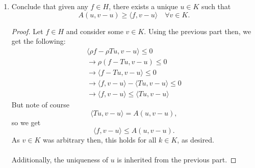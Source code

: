 \documentclass[12pt]{article}
\newenvironment{ex}[2][Exercise]{\begin{trivlist}
\item[\hskip \labelsep {\bfseries #1}\hskip \labelsep {\bfseries #2.}]}{\end{trivlist}}
\begin{document}
\begin{ex}{4}
\begin{enumerate}[label=(\alph*)]
\begin{enumerate}[label=(\arabic*)]
\begin{proof}
                as desired.
            \end{proof}
            \item Conclude that given any $f \in H$, there exists a unique $u \in K$ such that 
            $$A(u, v - u) \geq \langle f, v - u \rangle \quad \forall v \in K.$$
            \begin{proof}
                Let $f \in H$ and consider some $v \in K$. Using the previous part then, we get the following:
                \begin{align*}
                    \langle \rho f - \rho Tu, v - u \rangle \leq 0 \\ 
                    \longrightarrow \rho(f - Tu, v - u) \leq 0 \\
                    \longrightarrow \langle f - Tu, v - u \rangle \leq 0 \\
                    \longrightarrow \langle f, v - u \rangle - \langle Tu, v - u \rangle \leq 0 \\
                    \longrightarrow \langle f, v - u \rangle \leq \langle Tu, v - u \rangle
                \end{align*}
                But note of course 
                $$\langle Tu, v - u \rangle = A(u, v -u),$$
                so we get
                $$\langle f, v - u \rangle \leq A(u, v - u).$$
                As $v \in K$ was arbitrary then, this holds for all $k \in K$, as desired. \\ \\
                Additionally, the uniqueness of $u$ is inherited from the previous part.
            \end{proof}
        \end{enumerate}
    \end{enumerate}
\end{ex}
\end{document}
